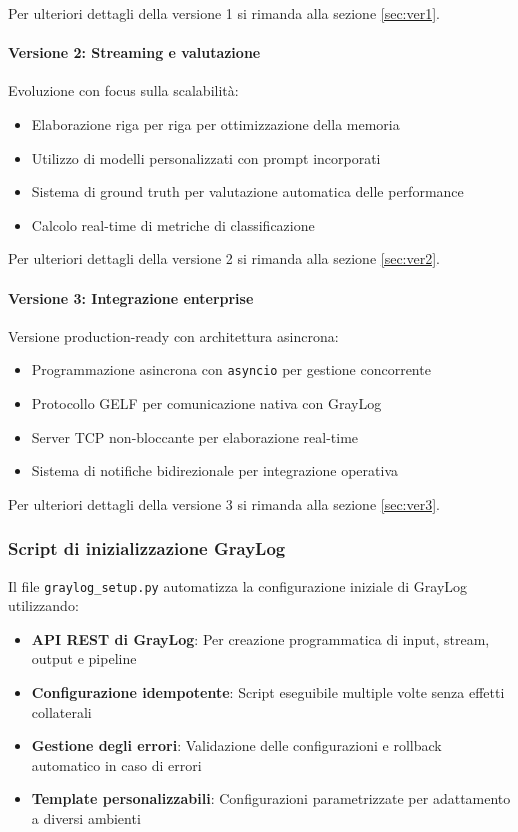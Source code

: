 \documentclass[12pt]{report}
\begin{document}
Per ulteriori dettagli della versione 1 si rimanda alla sezione \ref{sec:ver1}.

\paragraph{Versione 2: Streaming e valutazione}
Evoluzione con focus sulla scalabilità:
\begin{itemize}
    \item Elaborazione riga per riga per ottimizzazione della memoria
    \item Utilizzo di modelli personalizzati con prompt incorporati
    \item Sistema di ground truth per valutazione automatica delle performance
    \item Calcolo real-time di metriche di classificazione
\end{itemize}

Per ulteriori dettagli della versione 2 si rimanda alla sezione \ref{sec:ver2}.

\paragraph{Versione 3: Integrazione enterprise}
Versione production-ready con architettura asincrona:
\begin{itemize}
    \item Programmazione asincrona con \texttt{asyncio} per gestione concorrente
    \item Protocollo GELF per comunicazione nativa con GrayLog
    \item Server TCP non-bloccante per elaborazione real-time
    \item Sistema di notifiche bidirezionale per integrazione operativa
\end{itemize}

Per ulteriori dettagli della versione 3 si rimanda alla sezione \ref{sec:ver3}.

\subsubsection{Script di inizializzazione GrayLog}
Il file \texttt{graylog\_setup.py} automatizza la configurazione iniziale di GrayLog utilizzando:

\begin{itemize}
    \item \textbf{API REST di GrayLog}: Per creazione programmatica di input, stream, output e pipeline
    \item \textbf{Configurazione idempotente}: Script eseguibile multiple volte senza effetti collaterali
    \item \textbf{Gestione degli errori}: Validazione delle configurazioni e rollback automatico in caso di errori
    \item \textbf{Template personalizzabili}: Configurazioni parametrizzate per adattamento a diversi ambienti
\end{itemize}
\end{document}
